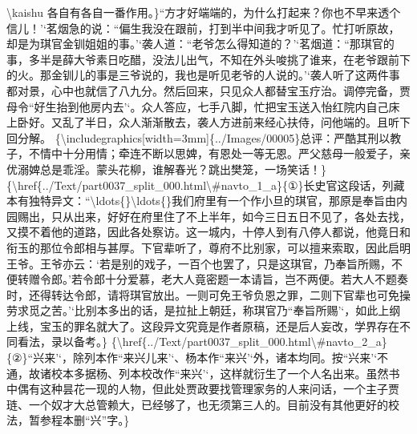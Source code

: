 \textbackslash{}kaishu
各自有各自一番作用。\}``方才好端端的，为什么打起来？你也不早来透个信儿！'`茗烟急的说：``偏生我没在跟前，打到半中间我才听见了。忙打听原故，却是为琪官金钏姐姐的事。'`袭人道：``老爷怎么得知道的？'`茗烟道：``那琪官的事，多半是薛大爷素日吃醋，没法儿出气，不知在外头唆挑了谁来，在老爷跟前下的火。那金钏儿的事是三爷说的，我也是听见老爷的人说的。'`袭人听了这两件事都对景，心中也就信了八九分。然后回来，只见众人都替宝玉疗治。调停完备，贾母令``好生抬到他房内去'`。众人答应，七手八脚，忙把宝玉送入怡红院内自己床上卧好。又乱了半日，众人渐渐散去，袭人方进前来经心扶侍，问他端的。且听下回分解。
\{\textbackslash{}includegraphics{[}width=3mm{]}\{../Images/00005\}总评：严酷其刑以教子，不情中十分用情；牵连不断以思婢，有恩处一等无恩。严父慈母一般爱子，亲优溺婢总是乖淫。蒙头花柳，谁解春光？跳出樊笼，一场笑话！\}
\{\textbackslash{}href\{../Text/part0037\_split\_000.html\textbackslash{}\#navto\_1\_a\}\{①\}长史官这段话，列藏本有独特异文：``\textbackslash{}ldots\{\}\textbackslash{}ldots\{\}我们府里有一个作小旦的琪官，那原是奉旨由内园赐出，只从出来，好好在府里住了不上半年，如今三日五日不见了，各处去找，又摸不着他的道路，因此各处察访。这一城内，十停人到有八停人都说，他竟日和衔玉的那位令郎相与甚厚。下官辈听了，尊府不比别家，可以擅来索取，因此启明王爷。王爷亦云：`若是别的戏子，一百个也罢了，只是这琪官，乃奉旨所赐，不便转赠令郎。'若令郎十分爱慕，老大人竟密题一本请旨，岂不两便。若大人不题奏时，还得转达令郎，请将琪官放出。一则可免王爷负恩之罪，二则下官辈也可免操劳求觅之苦。'`比别本多出的话，是拉扯上朝廷，称琪官乃``奉旨所赐'`，如此上纲上线，宝玉的罪名就大了。这段异文究竟是作者原稿，还是后人妄改，学界存在不同看法，录以备考。\}
\{\textbackslash{}href\{../Text/part0037\_split\_000.html\textbackslash{}\#navto\_2\_a\}\{②\}``兴来'`，除列本作``来兴儿来'`、杨本作``来兴'`外，诸本均同。按``兴来'`不通，故诸校本多据杨、列本校改作``来兴'`，这样就衍生了一个人名出来。虽然书中偶有这种昙花一现的人物，但此处贾政要找管理家务的人来问话，一个主子贾琏、一个奴才大总管赖大，已经够了，也无须第三人的。目前没有其他更好的校法，暂参程本删``兴''字。\}
